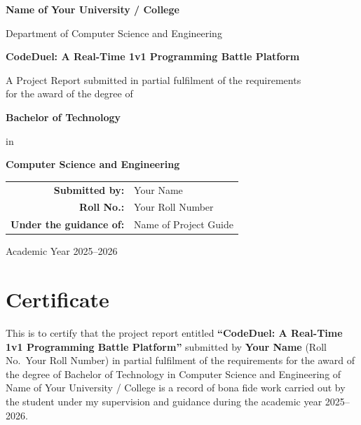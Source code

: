 \documentclass[12pt,a4paper,oneside]{report}
\newcommand{\projecttitle}{CodeDuel: A Real-Time 1v1 Programming Battle Platform}
\newcommand{\studentname}{Your Name}
\newcommand{\rollno}{Your Roll Number}
\newcommand{\guidename}{Name of Project Guide}
\newcommand{\department}{Department of Computer Science and Engineering}
\newcommand{\university}{Name of Your University / College}
\newcommand{\academicyear}{2025--2026}
\newcommand{\degree}{Bachelor of Technology}
\begin{document}

\begin{titlepage}
\centering
\vspace*{0.5cm}
{\Large\bfseries\color{cdblue}\university\par}
\vspace{0.3cm}
{\large\department\par}
\vspace{1.2cm}
\par
\vspace{1.2cm}
{\LARGE\bfseries \projecttitle\par}
\vspace{1.2cm}
{\large A Project Report submitted in partial fulfilment of the requirements\\
for the award of the degree of\par}
\vspace{0.4cm}
{\Large\bfseries \degree\par}
{\large in\par}
{\Large\bfseries Computer Science and Engineering\par}
\vspace{1.4cm}
\begin{tabular}{rl}
  \textbf{Submitted by:} & \studentname \\
  \textbf{Roll No.:}     & \rollno \\[1em]
  \textbf{Under the guidance of:} & \guidename \\
\end{tabular}
\vfill
{\large Academic Year \academicyear\par}
\end{titlepage}

\chapter*{Certificate}
This is to certify that the project report entitled \textbf{``\projecttitle''} submitted by
\textbf{\studentname} (Roll No.\ \rollno) in partial fulfilment of the requirements for the award of the
degree of \degree{} in Computer Science and Engineering of \university{} is a record of bona fide
work carried out by the student under my supervision and guidance during the academic year \academicyear.
\end{document}
